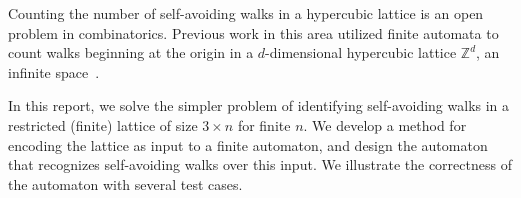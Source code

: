 Counting the number of self-avoiding walks in a hypercubic lattice is an open problem in combinatorics. Previous work in this area utilized finite automata to count walks beginning at the origin in a $d$-dimensional hypercubic lattice $\mathbb{Z}^d$, an infinite space~\cite{ponitz:walks:ejc:2000}. 

In this report, we solve the simpler problem of identifying self-avoiding walks in a restricted (finite) lattice of size $3\times n$ for finite $n$. We develop a method for encoding the lattice as input to a finite automaton, and design the automaton that recognizes self-avoiding walks over this input. We illustrate the correctness of the automaton with several test cases. 
